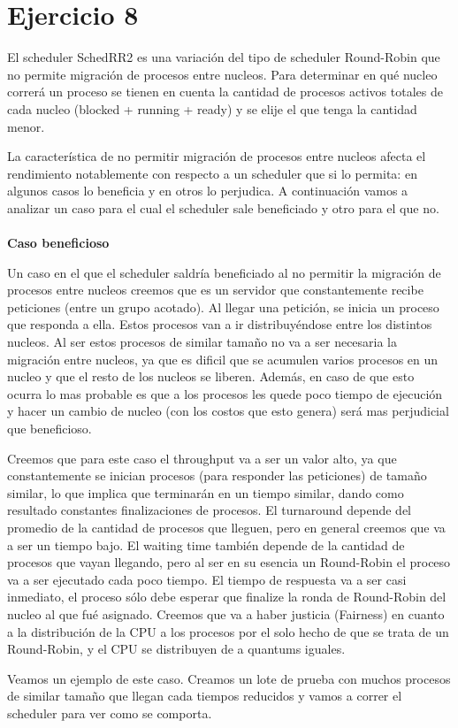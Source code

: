 \section{Ejercicio 8}

\par El scheduler SchedRR2 es una variación del tipo de scheduler Round-Robin que no permite migración de procesos entre nucleos. Para determinar en qué nucleo correrá un proceso se tienen en cuenta la cantidad de procesos activos totales de cada nucleo (blocked + running + ready) y se elije el que tenga la cantidad menor.

\par La característica de no permitir migración de procesos entre nucleos afecta el rendimiento notablemente con respecto a un scheduler que si lo permita: en algunos casos lo beneficia y en otros lo perjudica. A continuación vamos a analizar un caso para el cual el scheduler sale beneficiado y otro para el que no. \\\\

\textbf{Caso beneficioso}
\\
\par Un caso en el que el scheduler saldría beneficiado al no permitir la migración de procesos entre nucleos creemos que es un servidor que constantemente recibe peticiones (entre un grupo acotado). Al llegar una petición, se inicia un proceso que responda a ella. Estos procesos van a ir distribuyéndose entre los distintos nucleos. Al ser estos procesos de similar tamaño no va a ser necesaria la migración entre nucleos, ya que es dificil que se acumulen varios procesos en un nucleo y que el resto de los nucleos se liberen. Además, en caso de que esto ocurra lo mas probable es que a los procesos les quede poco tiempo de ejecución y hacer un cambio de nucleo (con los costos que esto genera) será mas perjudicial que beneficioso.
\par Creemos que para este caso el throughput va a ser un valor alto, ya que constantemente se inician procesos (para responder las peticiones) de tamaño similar, lo que implica que terminarán en un tiempo similar, dando como resultado constantes finalizaciones de procesos. El turnaround depende del promedio de la cantidad de procesos que lleguen, pero en general creemos que va a ser un tiempo bajo. El waiting time también depende de la cantidad de procesos que vayan llegando, pero al ser en su esencia un Round-Robin el proceso va a ser ejecutado cada poco tiempo. El tiempo de respuesta va a ser casi inmediato, el proceso sólo debe esperar que finalize la ronda de Round-Robin del nucleo al que fué asignado. Creemos que va a haber justicia (Fairness) en cuanto a la distribución de la CPU a los procesos por el solo hecho de que se trata de un Round-Robin, y el CPU se distribuyen de a quantums iguales. \\
\par Veamos un ejemplo de este caso. Creamos un lote de prueba con muchos procesos de similar tamaño que llegan cada tiempos reducidos y vamos a correr el scheduler para ver como se comporta.\\

